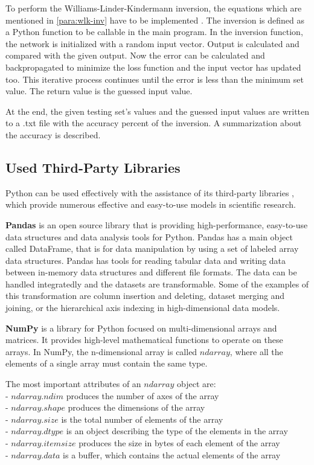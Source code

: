 To perform the Williams-Linder-Kindermann inversion, the equations which are mentioned in \autoref{para:wlk-inv} have to be implemented \cite{nazari1992implementation}. The inversion is defined as a Python function to be callable in the main program. In the inversion function, the network is initialized with a random input vector. Output is calculated and compared with the given output. Now the error can be calculated and backpropagated to minimize the loss function and the input vector has updated too. This iterative process continues until the error is less than the minimum set value. The return value is the guessed input value. \smallskip

At the end, the given testing set's values and the guessed input values are written to a .txt file with the accuracy percent of the inversion. A summarization about the accuracy is described.



\subsection{Used Third-Party Libraries}

Python can be used effectively with the assistance of its third-party libraries \cite{bressert2012scipy, chen2017pandas}, which provide numerous effective and easy-to-use models in scientific research. \bigskip

\textbf{Pandas} is an open source library that is providing high-performance, easy-to-use data structures and data analysis tools for Python. Pandas has a main object called DataFrame, that is for data manipulation by using a set of labeled array data structures. Pandas has tools for reading tabular data and writing data between in-memory data structures and different file formats. The data can be handled integratedly and the datasets are transformable. Some of the examples of this transformation are column insertion and deleting, dataset merging and joining, or the hierarchical axis indexing in high-dimensional data models.\bigskip

\textbf{NumPy} is a library for Python focused on multi-dimensional arrays and matrices. It provides high-level mathematical functions to operate on these arrays. In NumPy, the n-dimensional array is called $ndarray$, where all the elements of a single array must contain the same type. \medskip

\noindent The most important attributes of an $ndarray$ object are:\\
- $ndarray.ndim$ produces the number of axes of the array\\
- $ndarray.shape$ produces the dimensions of the array\\
- $ndarray.size$ is the total number of elements of the array\\
- $ndarray.dtype$ is an object describing the type of the elements in the array\\
- $ndarray.itemsize$ produces the size in bytes of each element of the array\\
- $ndarray.data$ is a buffer, which contains the actual elements of the array



